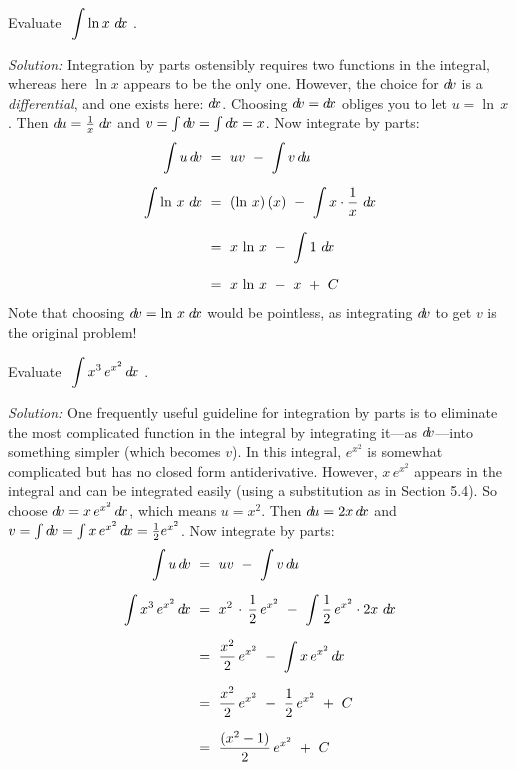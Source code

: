 \begin{exmp}\label{exmp:intparts3}
\noindent Evaluate $~\displaystyle\int \ln x~d\!x~$.\vspace{1mm}
\par\noindent\emph{Solution:} Integration by parts ostensibly requires two
functions in the integral, whereas here $\ln x$ appears to be the only one.
However, the choice for $d\!v$ is a \emph{differential}, and one exists here:
$d\!x$. Choosing $d\!v = d\!x$ obliges you to let $u = \ln\,x$. Then
$d\!u = \frac{1}{x}\;d\!x$ and $v = \int d\!v = \int d\!x = x$. Now integrate by
parts:
\begin{align*}
\int u\,d\!v ~&=~ uv ~-~ \int v\,d\!u\\[6pt]
\int \ln\,x~d\!x ~&=~ (\ln\,x)\,(x) ~-~ \int x \cdot \frac{1}{x}~d\!x\\[6pt]
&=~ x\,\ln\,x ~-~ \int 1~d\!x\\[6pt]
&=~ x\,\ln\,x ~-~ x ~+~ C
\end{align*}
Note that choosing $d\!v = \ln\,x\;d\!x$ would be pointless, as integrating
$d\!v$ to get $v$ is the original problem!
\end{exmp}
\begin{exmp}\label{exmp:intparts4}
\noindent Evaluate $~\displaystyle\int x^3\,e^{x^2}\,d\!x~$.\vspace{1mm}
\par\noindent\emph{Solution:} One frequently useful guideline for integration
by parts is to eliminate the most complicated function in the integral by
integrating it---as $d\!v$---into something simpler (which becomes $v$). In
this integral, $e^{x^2}$ is somewhat complicated but has no
closed form antiderivative. However, $x\,e^{x^2}$ appears in the
integral and can be integrated easily (using a substitution as in Section 5.4).
So choose $d\!v = x\,e^{x^2}\,d\!x$, which means $u = x^2$. Then
$d\!u = 2x\,d\!x$ and $v = \int d\!v = \int x\,e^{x^2}\,d\!x = \frac{1}{2}e^{x^2}$.
Now integrate by parts:
\begin{align*}
\int u\,d\!v ~&=~ uv ~-~ \int v\,d\!u\\[6pt]
\int x^3\,e^{x^2}\,d\!x ~&=~ x^2\,\cdot\,\frac{1}{2}\,e^{x^2} ~-~
\int \frac{1}{2}\,e^{x^2} \cdot 2x~d\!x\\[6pt]
&=~ \frac{x^2}{2}\,e^{x^2} ~-~ \int x\,e^{x^2}\,d\!x\\[6pt]
&=~ \frac{x^2}{2}\,e^{x^2} ~-~ \frac{1}{2}\,e^{x^2} ~+~ C\\[6pt]
&=~ \frac{(x^2 - 1)}{2}\,e^{x^2} ~+~ C
\end{align*}
\end{exmp}
